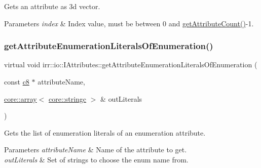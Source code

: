 Gets an attribute as 3d vector. 


\begin{DoxyParams}{Parameters}
{\em index} & Index value, must be between 0 and \hyperlink{classirr_1_1io_1_1IAttributes_a796bdd9440ee7ba0b6742a90a82870b6}{get\+Attribute\+Count()}-\/1. \\
\hline
\end{DoxyParams}
\mbox{\label{classirr_1_1io_1_1IAttributes_a74980af4d5297b74670f55711e25fd79}} 
\subsubsection{\texorpdfstring{get\+Attribute\+Enumeration\+Literals\+Of\+Enumeration()}{getAttributeEnumerationLiteralsOfEnumeration()}\hspace{0.1cm}{\footnotesize\ttfamily [1/4]}}
{\footnotesize\ttfamily virtual void irr\+::io\+::\+I\+Attributes\+::get\+Attribute\+Enumeration\+Literals\+Of\+Enumeration (\begin{DoxyParamCaption}\item[{const \hyperlink{namespaceirr_a9395eaea339bcb546b319e9c96bf7410}{c8} $\ast$}]{attribute\+Name,  }\item[{\hyperlink{classirr_1_1core_1_1array}{core\+::array}$<$ \hyperlink{namespaceirr_1_1core_ab26a0e0359206b5a694f35c37c829d7f}{core\+::stringc} $>$ \&}]{out\+Literals }\end{DoxyParamCaption})\hspace{0.3cm}{\ttfamily [pure virtual]}}



Gets the list of enumeration literals of an enumeration attribute. 


\begin{DoxyParams}{Parameters}
{\em attribute\+Name} & Name of the attribute to get. \\
\hline
{\em out\+Literals} & Set of strings to choose the enum name from. \\
\hline
\end{DoxyParams}
\mbox{\label{classirr_1_1io_1_1IAttributes_a74980af4d5297b74670f55711e25fd79}} 
